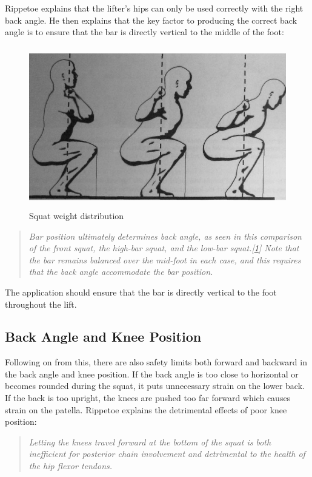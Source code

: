 Rippetoe explains that the lifter's hips can only be used correctly with the right back angle. He then explains that the key factor to producing the correct back angle is to ensure that the bar is directly vertical to the middle of the foot:

\begin{figure}[H]
    \centering
	\includegraphics[height=7cm]{squat/images/rippetoe_weight_distro}
\caption{Squat weight distribution}
\label{fig:rippetoe_weight}
\end{figure}

\begin{quote}
\emph{Bar position ultimately determines back angle, as seen in this comparison of the front squat, the high-bar squat, and the low-bar squat.[\ref{fig:rippetoe_weight}] Note that the bar remains balanced over the mid-foot in each case, and this requires that the back angle accommodate the bar position.}
\end{quote}

The application should ensure that the bar is directly vertical to the foot throughout the lift.

\subsection{Back Angle and Knee Position}

Following on from this, there are also safety limits both forward and backward in the back angle and knee position. If the back angle is too close to horizontal or becomes rounded during the squat, it puts unnecessary strain on the lower back. If the back is too upright, the knees are pushed too far forward which causes strain on the patella. Rippetoe explains the detrimental effects of poor knee position:

\begin{quote}
\emph{Letting the knees travel forward at the bottom of the squat is both inefficient for posterior chain involvement and detrimental to the health of the hip flexor tendons.}
\end{quote}

